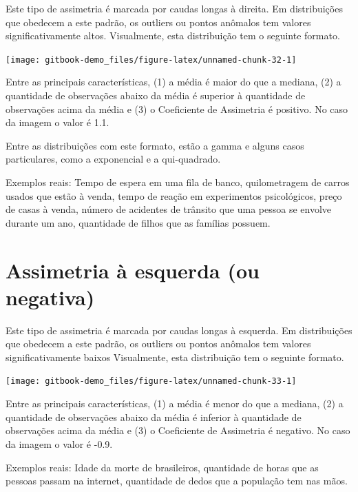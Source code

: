\documentclass[
]{book}
\begin{document}
Este tipo de assimetria é marcada por caudas longas à direita. Em distribuições que obedecem a este padrão, os outliers ou pontos anômalos tem valores significativamente altos. Visualmente, esta distribuição tem o seguinte formato.

\begin{center}\texttt{[image: gitbook-demo\_files/figure-latex/unnamed-chunk-32-1]} \end{center}

Entre as principais características, (1) a média é maior do que a mediana, (2) a quantidade de observações abaixo da média é superior à quantidade de observações acima da média e (3) o Coeficiente de Assimetria é positivo. No caso da imagem o valor é 1.1.

Entre as distribuições com este formato, estão a gamma e alguns casos particulares, como a exponencial e a qui-quadrado.

Exemplos reais: Tempo de espera em uma fila de banco, quilometragem de carros usados que estão à venda, tempo de reação em experimentos psicológicos, preço de casas à venda, número de acidentes de trânsito que uma pessoa se envolve durante um ano, quantidade de filhos que as famílias possuem.

\hypertarget{assimetria-uxe0-esquerda-ou-negativa}{%
\section{Assimetria à esquerda (ou negativa)}\label{assimetria-uxe0-esquerda-ou-negativa}}

Este tipo de assimetria é marcada por caudas longas à esquerda. Em distribuições que obedecem a este padrão, os outliers ou pontos anômalos tem valores significativamente baixos Visualmente, esta distribuição tem o seguinte formato.

\begin{center}\texttt{[image: gitbook-demo\_files/figure-latex/unnamed-chunk-33-1]} \end{center}

Entre as principais características, (1) a média é menor do que a mediana, (2) a quantidade de observações abaixo da média é inferior à quantidade de observações acima da média e (3) o Coeficiente de Assimetria é negativo. No caso da imagem o valor é -0.9.

Exemplos reais: Idade da morte de brasileiros, quantidade de horas que as pessoas passam na internet, quantidade de dedos que a população tem nas mãos.
\end{document}
